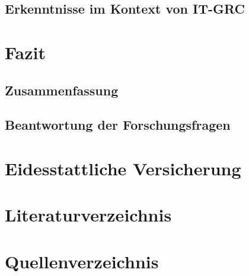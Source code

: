 \documentclass[10pt]{article}
\begin{document}
\subsection{Erkenntnisse im Kontext von IT-GRC}
\section{Fazit}
\subsection{Zusammenfassung}
\subsection{Beantwortung der Forschungsfragen}
\section{Eidesstattliche Versicherung}
\section{Literaturverzeichnis}
\section{Quellenverzeichnis}
\printbibliography
\end{document}
